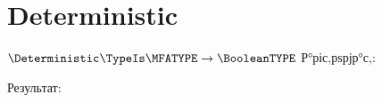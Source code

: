 \section{Deterministic}
\begin{frame}{$\Deterministic\TypeIs\MFATYPE\to\BooleanTYPE$}
	Р°ріс‚рѕрјр°с‚:

	Результат:
\end{frame}